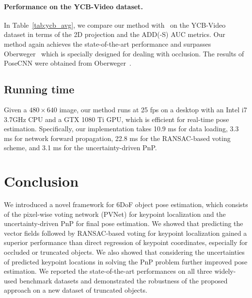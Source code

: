 \documentclass[10pt,twocolumn,letterpaper]{article}
\begin{document}
\paragraph{Performance on the YCB-Video dataset.} In Table~\ref{tab:ycb_avg}, we compare our method with~\cite{ xiang2017posecnn, oberweger2018making} on the YCB-Video dataset in terms of the 2D projection and the ADD(-S) AUC metrics. Our method again achieves the state-of-the-art performance and surpasses Oberweger~\cite{oberweger2018making} which is specially designed for dealing with occlusion. The results of PoseCNN were obtained from Oberweger~\cite{oberweger2018making}.

\begin{table}
\begin{center}
 \end{center}
\vspace{-0.2mm}
\caption{The accuracies of our method and the baseline methods on the YCB-Video dataset in terms of the \textbf{2D projection} and the \textbf{ADD(-S) AUC} metrics.}
\label{tab:ycb_avg}
\vspace{-2mm}
\end{table} 
\subsection{Running time}

Given a $480 \times 640$ image, our method runs at 25 fps on a desktop with an Intel i7 3.7GHz CPU and a GTX 1080 Ti GPU, which is efficient for real-time pose estimation. Specifically, our implementation takes 10.9 ms for data loading, 3.3 ms for network forward propagation, 22.8 ms for the RANSAC-based voting scheme, and 3.1 ms for the uncertainty-driven PnP.
 \section{Conclusion}

We introduced a novel framework for 6DoF object pose estimation, which consists of the pixel-wise voting network (PVNet) for keypoint localization and the uncertainty-driven PnP for final pose estimation. We showed that predicting the vector fields followed by RANSAC-based voting for keypoint localization gained a superior performance than direct regression of keypoint coordinates, especially for occluded or truncated objects. We also showed that considering the uncertainties of predicted keypoint locations in solving the PnP problem further improved pose estimation. We reported the state-of-the-art performances on all three widely-used benchmark datasets and demonstrated the robustness of the proposed approach on a new dataset of truncated objects. 
 
{\small


}
\end{document}
